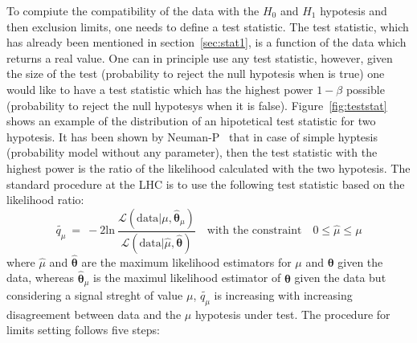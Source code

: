 To compiute the compatibility of the data with the $H_{0}$ and $H_{1}$ hypotesis and then exclusion limits, 
one needs to define a test statistic. The test statistic, which has already been mentioned in section~\ref{sec:stat1},
is a function of the data which returns a real value. One can in principle use any test statistic, however, 
given the size of the test (probability to reject the null hypotesis when is true) one would like to have 
a test statistic which has the highest power $1 - \beta$ possible (probability to reject the 
null hypotesys when it is false). Figure~\ref{fig:teststat} shows an example
of the distribution of an hipotetical test statistic for two hypotesis.
It has been shown by Neuman-P~\cite{} that in case of simple hyptesis (probability model without any parameter),
then the test statistic with the highest power is the ratio of the likelihood calculated with the two hypotesis.
The standard procedure at the LHC is to use the following test statistic \cite{} based on the likelihood ratio:
$$
\tilde{q_{\mu}} ~ = ~ -2 \text{ln} ~ \frac{\mathcal{L}(\text{data}|\mu, \hat{\boldsymbol{\theta}}_{\mu})}{\mathcal{L}(\text{data}|\hat{\mu}, \hat{\boldsymbol{\theta}})}
\quad \text{with the constraint} \quad 0 \leq \hat{\mu} \leq \mu
$$
 where $\hat{\mu}$ and $\hat{\boldsymbol{\theta}}$ are the maximum likelihood estimators for $\mu$ and $\boldsymbol{\theta}$ given the data, 
whereas $\hat{\boldsymbol{\theta}}_{\mu}$ is the maximul likelihood estimator of $\boldsymbol{\theta}$ given the data but considering
a signal streght of value $\mu$, $\tilde{q_{\mu}}$ is increasing with increasing disagreement between data and the $\mu$ hypotesis under test.
The procedure for limits setting follows five steps:
